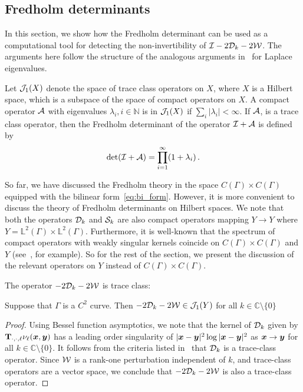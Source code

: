 \subsection{Fredholm determinants}
\label{sec:dets}
In this section, we show
how the Fredholm determinant can be used
as a computational tool for detecting the
non-invertibility of $\mathcal I - 2{\mathcal D}_{k} - 2{\mathcal W}$.
The arguments here follow the structure of the
analogous arguments in~\cite{zhao2015robust}
for Laplace eigenvalues.

Let ${\mathcal J}_{1}(X)$ denote the space of trace class operators 
on $X$, where $X$ is a Hilbert space, which is a
subspace of the space of compact operators on $X$.
A compact operator ${\mathcal A}$ with eigenvalues
$\lambda_{i}, i\in \mathbb{N}$ is in ${\mathcal J}_{1}(X)$ if
$\sum_{i} |\lambda_{i}| < \infty$.
If ${\mathcal A}$, is a trace class operator, then  
the Fredholm determinant of the operator $\mathcal I + {\mathcal A}$
is defined by
\begin{equation}
\text{det}(\mathcal I +{\mathcal A}) = \prod_{i=1}^{\infty} (1+\lambda_{i}) \, .
\end{equation}

So far, we have discussed the Fredholm theory in the space
$C(\Gamma)\times C(\Gamma)$ equipped with the bilinear form~\cref{eq:bi_form}.
However, it is more convenient to discuss the theory of Fredholm
determinants on Hilbert spaces. 
We note that both the operators ${\mathcal D}_{k}$ and ${\mathcal S}_{k}$ 
are also compact operators mapping $Y \to Y$
where $Y = \mathbb{L}^{2}(\Gamma) \times \mathbb{L}^{2}(\Gamma)$.
Furthermore, it is well-known that the spectrum of compact
operators with weakly singular kernels coincide on 
$C(\Gamma)\times C(\Gamma)$ and $Y$ (see~\cite{kress1989linear},
for example).
So for the rest of the section, we present the discussion of 
the relevant operators on $Y$ instead of $C(\Gamma)\times C(\Gamma)$.


The operator $-2{\mathcal D}_{k} - 2{\mathcal W}$ is trace class:
\begin{lem}
  Suppose that $\Gamma$ is a $C^2$ curve.
  Then $-2{\mathcal D}_{k} - 2{\mathcal W} \in {\mathcal J}_1(Y)$
  for all $k \in \mathbb{C} \setminus \{0\}$ 
\end{lem}
\begin{proof}
Using Bessel function asymptotics, we note that the
kernel of ${\mathcal D}_{k}$ given by ${\bf T}_{\cdot,\cdot,\ell}\nu_{\ell}({\boldsymbol x},{\boldsymbol y})$
has a leading order singularity of
$|{\boldsymbol x}-{\boldsymbol y}|^2 \log{|{\boldsymbol x}-{\boldsymbol y}|^2}$ as ${\boldsymbol x}\to {\boldsymbol y}$ 
for all $k \in \mathbb{C} \setminus \{ 0\}$.
It follows from the criteria listed
in~\cite[Sec. 2]{bornemann2010numerical} that ${\mathcal D}_{k}$
is a trace-class operator.
Since ${\mathcal W}$ is a rank-one perturbation independent of $k$,
and trace-class operators are a vector space, we conclude
that $-2{\mathcal D}_{k} - 2{\mathcal W}$ is also a trace-class operator.
\end{proof}

